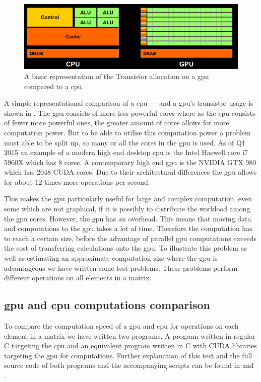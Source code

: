 \begin{figure}[h!]
\centering
 \includegraphics[width=1\textwidth]{figures/GPUCPUimage.png} %
\caption{A basic representation of the Transistor allocation on a \acrshort{gpu} compared to a \acrshort{cpu}. \citep{NvidiaCUDASeminar}}\label{image:gpucpuimage}
\vspace{-15pt}
\end{figure}

A simple representational comparison of a \acrshort{cpu} --- and a \acrshort{gpu}'s transistor usage is shown in .
The \acrshort{gpu} consists of more less powerful cores where as the \acrshort{cpu} consists of fewer more powerful ones, the greater amount of cores allows for more computation power.
But to be able to utilise this computation power a problem must able to be split up, so many or all the cores in the \acrshort{gpu} is used.
As of Q1 2015 an example of a modern high end desktop \acrshort{cpu} is the Intel Haswell core i7 5960X which has 8 cores. \citep{puget}
A contemporary high end \acrshort{gpu} is the NVIDIA GTX 980 which has 2048 CUDA cores. \citep{techpowerup,gtx980}
Due to their architectural differences the \acrshort{gpu} allows for about 12 times more operations per second.

This makes the \acrshort{gpu} particularly useful for large and complex computation, even some which are not graphical, if it is possibly to distribute the workload among the \acrshort{gpu} cores.
However, the \acrshort{gpu} has an overhead.
This means that moving data and computations to the \acrshort{gpu} takes a lot af time.
Therefore the computation has to reach a certain size, before the advantage of parallel \acrshort{gpu} computations exceeds the cost of transferring calculations onto the \acrshort{gpu}.
To illustrate this problem as well as estimating an approximate computation size where the \acrshort{gpu} is advantageous we have written some test problems. 
These problems perform different operations on all elements in a matrix. 

\subsection{\acrshort{gpu} and \acrshort{cpu} computations comparison}
To compare the computation speed of a \acrshort{gpu} and \acrshort{cpu} for operations on each element in a matrix we have written two programs.
A program written in regular C targeting the \acrshort{cpu} and an equivalent program written in C with CUDA libraries targeting the \acrshort{gpu} for computations.
Further explanation of this test and the full source code of both programs and the accompanying scripts can be found in  and .

